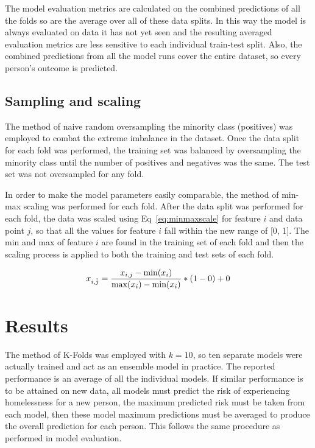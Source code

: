 \documentclass[10pt,letterpaper]{article}
\begin{document}
The model evaluation metrics are calculated on the combined predictions of all the folds so are the average over all of these data splits. In this way the model is always evaluated on data it has not yet seen and the resulting averaged evaluation metrics are less sensitive to each individual train-test split. Also, the combined predictions from all the model runs cover the entire dataset, so every person's outcome is predicted.

\subsection*{Sampling and scaling}
The method of naive random oversampling the minority class (positives) was employed to combat the extreme imbalance in the dataset. Once the data split for each fold was performed, the training set was balanced by oversampling the minority class until the number of positives and negatives was the same. The test set was not oversampled for any fold.

In order to make the model parameters easily comparable, the method of min-max scaling was performed for each fold. After the data split was performed for each fold, the data was scaled using Eq~\ref{eq:minmaxscale} for feature $i$ and data point $j$, so that all the values for feature $i$ fall within the new range of [0, 1]. The min and max of feature $i$ are found in the training set of each fold and then the scaling process is applied to both the training and test sets of each fold.

\begin{equation}
    \centering
    x_{i, \hat{j}} = \frac{x_{i, j} - \text{min}(x_{i})}{\text{max}(x_{i}) - \text{min}(x_{i})}
    * (1 - 0) + 0
    \label{eq:minmaxscale}
\end{equation}

\section*{Results}
The method of K-Folds was employed with $k=10$, so ten separate models were actually trained and act as an ensemble model in practice. The reported performance is an average of all the individual models. If similar performance is to be attained on new data, all models must predict the risk of experiencing homelessness for a new person, the maximum predicted risk must be taken from each model, then these model maximum predictions must be averaged to produce the overall prediction for each person. This follows the same procedure as performed in model evaluation.
\end{document}

